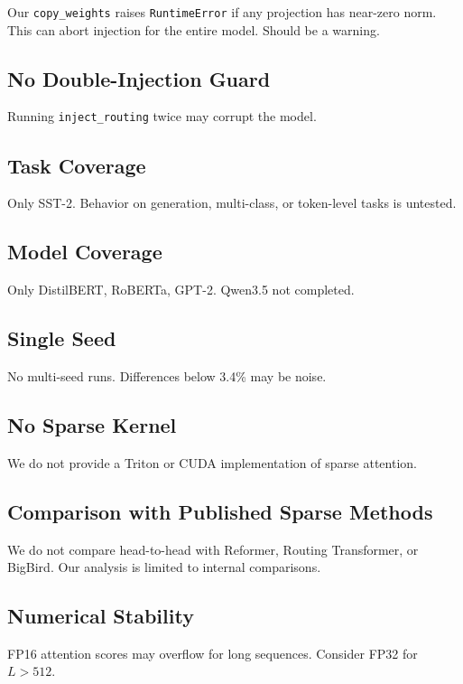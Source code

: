 Our \texttt{copy\_weights} raises \texttt{RuntimeError} if any projection has near-zero 
norm. This can abort injection for the entire model. Should be a warning.

\subsection{No Double-Injection Guard}

Running \texttt{inject\_routing} twice may corrupt the model.

\subsection{Task Coverage}

Only SST-2. Behavior on generation, multi-class, or token-level tasks is 
untested.

\subsection{Model Coverage}

Only DistilBERT, RoBERTa, GPT-2. Qwen3.5 not completed.

\subsection{Single Seed}

No multi-seed runs. Differences below 3.4\% may be noise.

\subsection{No Sparse Kernel}

We do not provide a Triton or CUDA implementation of sparse attention.

\subsection{Comparison with Published Sparse Methods}

We do not compare head-to-head with Reformer, Routing Transformer, or 
BigBird. Our analysis is limited to internal comparisons.

\subsection{Numerical Stability}

FP16 attention scores may overflow for long sequences. Consider FP32 for 
$L > 512$.

